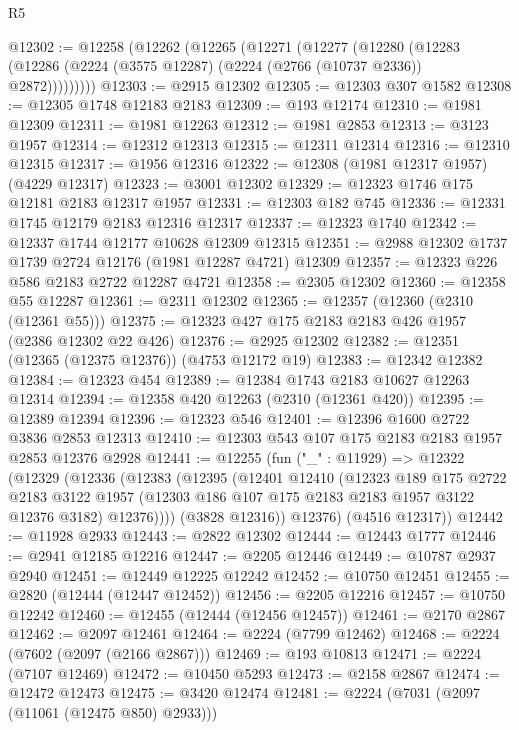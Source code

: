 \begin{lexlean}{R5}
\begin{coremodule}
@12302 := @12258
    (@12262
      (@12265
        (@12271
          (@12277
            (@12280
              (@12283 (@12286 (@2224 (@3575 @12287) (@2224 (@2766 (@10737 @2336)) @2872)))))))))
@12303 := @2915 @12302
@12305 := @12303 @307 @1582
@12308 := @12305 @1748 @12183 @2183
@12309 := @193 @12174
@12310 := @1981 @12309
@12311 := @1981 @12263
@12312 := @1981 @2853
@12313 := @3123 @1957
@12314 := @12312 @12313
@12315 := @12311 @12314
@12316 := @12310 @12315
@12317 := @1956 @12316
@12322 := @12308 (@1981 @12317 @1957) (@4229 @12317)
@12323 := @3001 @12302
@12329 := @12323 @1746 @175 @12181 @2183 @12317 @1957
@12331 := @12303 @182 @745
@12336 := @12331 @1745 @12179 @2183 @12316 @12317
@12337 := @12323 @1740
@12342 := @12337 @1744 @12177 @10628 @12309 @12315
@12351 := @2988 @12302 @1737 @1739 @2724 @12176 (@1981 @12287 @4721) @12309
@12357 := @12323 @226 @586 @2183 @2722 @12287 @4721
@12358 := @2305 @12302
@12360 := @12358 @55 @12287
@12361 := @2311 @12302
@12365 := @12357 (@12360 (@2310 (@12361 @55)))
@12375 := @12323 @427 @175 @2183 @2183 @426 @1957 (@2386 @12302 @22 @426)
@12376 := @2925 @12302
@12382 := @12351 (@12365 (@12375 @12376)) (@4753 @12172 @19)
@12383 := @12342 @12382
@12384 := @12323 @454
@12389 := @12384 @1743 @2183 @10627 @12263 @12314
@12394 := @12358 @420 @12263 (@2310 (@12361 @420))
@12395 := @12389 @12394
@12396 := @12323 @546
@12401 := @12396 @1600 @2722 @3836 @2853 @12313
@12410 := @12303 @543 @107 @175 @2183 @2183 @1957 @2853 @12376 @2928
@12441 := @12255
    (fun ("_" : @11929) =>
    @12322
      (@12329
        (@12336
          (@12383
            (@12395
              (@12401
                @12410
                (@12323
                  @189
                  @175
                  @2722
                  @2183
                  @3122
                  @1957
                  (@12303 @186 @107 @175 @2183 @2183 @1957 @3122 @12376 @3182)
                  @12376))))
          (@3828 @12316))
        @12376)
      (@4516 @12317))
@12442 := @11928 @2933
@12443 := @2822 @12302
@12444 := @12443 @1777
@12446 := @2941 @12185 @12216
@12447 := @2205 @12446
@12449 := @10787 @2937 @2940
@12451 := @12449 @12225 @12242
@12452 := @10750 @12451
@12455 := @2820 (@12444 (@12447 @12452))
@12456 := @2205 @12216
@12457 := @10750 @12242
@12460 := @12455 (@12444 (@12456 @12457))
@12461 := @2170 @2867
@12462 := @2097 @12461
@12464 := @2224 (@7799 @12462)
@12468 := @2224 (@7602 (@2097 (@2166 @2867)))
@12469 := @193 @10813
@12471 := @2224 (@7107 @12469)
@12472 := @10450 @5293
@12473 := @2158 @2867
@12474 := @12472 @12473
@12475 := @3420 @12474
@12481 := @2224 (@7031 (@2097 (@11061 (@12475 @850) @2933)))

\end{coremodule}
\end{lexlean}
